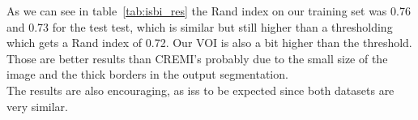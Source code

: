 As we can see in table~\ref{tab:isbi_res} the Rand index on our training set was 0.76 and 0.73 for the test test, 
which is similar but still higher than a thresholding which gets a Rand index of 0.72.
Our VOI is also a bit higher than the threshold.\\
Those are better results than CREMI's probably due to the small size of the
image and the thick borders in the output segmentation.\\ 

The results are also encouraging, as iss to be expected since both datasets are
very similar.

